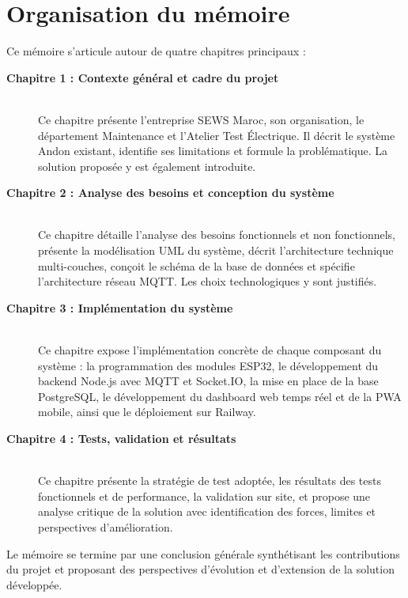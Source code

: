 \section*{Organisation du mémoire}

Ce mémoire s'articule autour de quatre chapitres principaux :

\begin{description}
    \item[\textbf{Chapitre 1 : Contexte général et cadre du projet}] ~\\
    Ce chapitre présente l'entreprise SEWS Maroc, son organisation, le département Maintenance et l'Atelier Test Électrique. Il décrit le système Andon existant, identifie ses limitations et formule la problématique. La solution proposée y est également introduite.
    
    \item[\textbf{Chapitre 2 : Analyse des besoins et conception du système}] ~\\
    Ce chapitre détaille l'analyse des besoins fonctionnels et non fonctionnels, présente la modélisation UML du système, décrit l'architecture technique multi-couches, conçoit le schéma de la base de données et spécifie l'architecture réseau MQTT. Les choix technologiques y sont justifiés.
    
    \item[\textbf{Chapitre 3 : Implémentation du système}] ~\\
    Ce chapitre expose l'implémentation concrète de chaque composant du système : la programmation des modules ESP32, le développement du backend Node.js avec MQTT et Socket.IO, la mise en place de la base PostgreSQL, le développement du dashboard web temps réel et de la PWA mobile, ainsi que le déploiement sur Railway.
    
    \item[\textbf{Chapitre 4 : Tests, validation et résultats}] ~\\
    Ce chapitre présente la stratégie de test adoptée, les résultats des tests fonctionnels et de performance, la validation sur site, et propose une analyse critique de la solution avec identification des forces, limites et perspectives d'amélioration.
\end{description}

Le mémoire se termine par une conclusion générale synthétisant les contributions du projet et proposant des perspectives d'évolution et d'extension de la solution développée.

\clearpage
